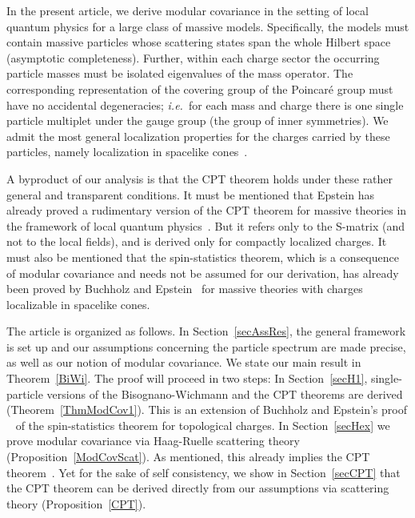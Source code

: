\documentclass[a4paper,reqno,11pt]{amsart}
\theoremstyle{plain}
\theoremstyle{definition}
\numberwithin{equation}{section}
\begin{document}
In the present article, we 
derive modular covariance in the setting of local quantum physics
for a large class of massive models.  
Specifically, the models must contain massive particles whose scattering states
span the whole Hilbert space (asymptotic completeness). 
Further, within each  
charge sector the occurring particle masses must be isolated
eigenvalues of the mass operator. 
The corresponding representation of 
the covering group of the Poincar\'e group must have no accidental
degeneracies; {\it i.e.\ }for each mass and charge there is one single
particle multiplet under the gauge group (the group of inner symmetries). 
We admit the most general localization properties for
the charges carried by these particles, namely localization in
spacelike cones~\cite{BuF}. 

A byproduct of our analysis is that the CPT theorem holds
under these rather general and transparent conditions. 
It must be mentioned that 
Epstein has already proved a rudimentary version of the CPT theorem for
massive theories in the framework of local 
quantum physics~\cite{Ep}. But it refers only to the S-matrix (and not 
to the local fields), and is derived only for compactly localized charges. 
It must also be  mentioned that the spin-statistics theorem, 
which is a consequence of modular covariance and needs not be assumed
for our derivation, 
has already been proved by Buchholz and Epstein~\cite{BuEp} for massive
theories with  charges localizable in spacelike cones.   

The article is organized as follows. In Section~\ref{secAssRes}, the 
general framework is set up and our assumptions concerning 
the particle spectrum are made precise, as well as our notion of 
modular covariance. We state our main result 
in Theorem~\ref{BiWi}. 
The proof will proceed in two steps: In Section~\ref{secH1}, 
single-particle versions of the Bisognano-Wichmann and the CPT theorems 
are derived (Theorem~\ref{ThmModCov1}). This is an extension of 
Buchholz and Epstein's proof ~\cite{BuEp} of the spin-statistics theorem for 
topological charges. In Section~\ref{secHex} we prove modular 
covariance via Haag-Ruelle scattering theory 
(Proposition~\ref{ModCovScat}). As mentioned, this already implies 
the CPT theorem~\cite{GL}. Yet for the sake of 
self consistency, we show in Section~\ref{secCPT} that the 
CPT theorem can be derived directly from our assumptions via 
scattering theory (Proposition~\ref{CPT}). 
\end{document}
